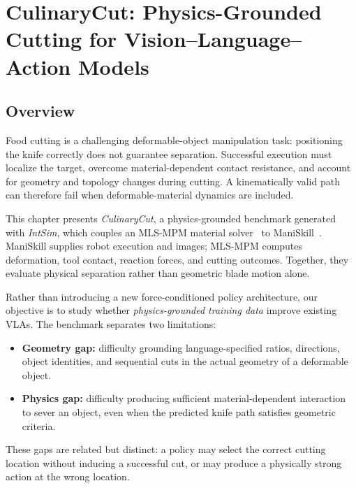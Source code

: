 
\clearpage
\chapter{CulinaryCut: Physics-Grounded Cutting for Vision--Language--Action Models}
\label{CH5_CUTTINGSIM}

\providecommand{\CutTableSetup}{%
  \small
  \setstretch{1}%
  \setlength{\tabcolsep}{3.5pt}%
  \renewcommand{\arraystretch}{1.16}%
}

\section{Overview}
\label{sec:cut_overview}

Food cutting is a challenging deformable-object manipulation task: positioning the knife correctly does not guarantee separation. Successful execution must localize the target, overcome material-dependent contact resistance, and account for geometry and topology changes during cutting. A kinematically valid path can therefore fail when deformable-material dynamics are included.

This chapter presents \emph{CulinaryCut}, a physics-grounded benchmark generated with \emph{IntSim}, which couples an MLS-MPM material solver~\cite{2018-MLSMPM} to ManiSkill~\cite{gu2023ManiSkill2}. ManiSkill supplies robot execution and images; MLS-MPM computes deformation, tool contact, reaction forces, and cutting outcomes. Together, they evaluate physical separation rather than geometric blade motion alone.

Rather than introducing a new force-conditioned policy architecture, our objective is to study whether \emph{physics-grounded training data} improve existing VLAs. The benchmark separates two limitations:
\begin{itemize}
  \item \textbf{Geometry gap:} difficulty grounding language-specified ratios, directions, object identities, and sequential cuts in the actual geometry of a deformable object.
  \item \textbf{Physics gap:} difficulty producing sufficient material-dependent interaction to sever an object, even when the predicted knife path satisfies geometric criteria.
\end{itemize}
These gaps are related but distinct: a policy may select the correct cutting location without inducing a successful cut, or may produce a physically strong action at the wrong location.


